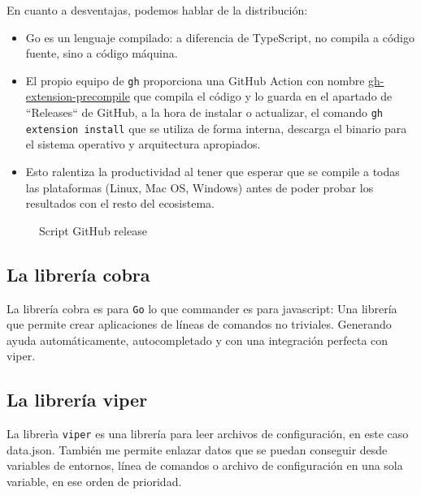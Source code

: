 En cuanto a desventajas, podemos hablar de la distribución:

\begin{itemize}
    \item Go es un lenguaje compilado: a diferencia de TypeScript, no compila a código fuente, sino a código máquina. 
    \item El propio equipo de \verb|gh| proporciona una GitHub Action \cite{githubAction} con nombre \href{https://github.com/cli/gh-extension-precompile}{gh-extension-precompile} que compila el código y lo guarda en el apartado de ``Releases`` de GitHub, a la hora de instalar o actualizar, el comando \verb|gh extension install| que se utiliza de forma interna, descarga el binario para el sistema operativo y arquitectura apropiados. 
    \item Esto ralentiza la productividad al tener que esperar que se compile a todas las plataformas (Linux, Mac OS, Windows) antes de poder probar los resultados con el resto del ecosistema.
\end{itemize}

\begin{figure}[htb]
    \centering
    \caption{Script GitHub release}
    \label{fig:gitHubRelease}
\end{figure}

\subsection{La librería cobra}
La librería cobra \cite{cobra} es para \verb|Go| lo que commander es para javascript: Una librería que permite crear aplicaciones de líneas de comandos no triviales. Generando ayuda automáticamente, autocompletado y con una integración perfecta con viper.

\subsection{La librería viper}
La librerìa
{\tt viper}\cite{viper} es una librería para leer archivos de configuración, en este caso data.json. 
También me permite enlazar datos que se puedan conseguir desde variables de entornos, línea de comandos o archivo de configuración en una sola variable, en ese orden de prioridad.

